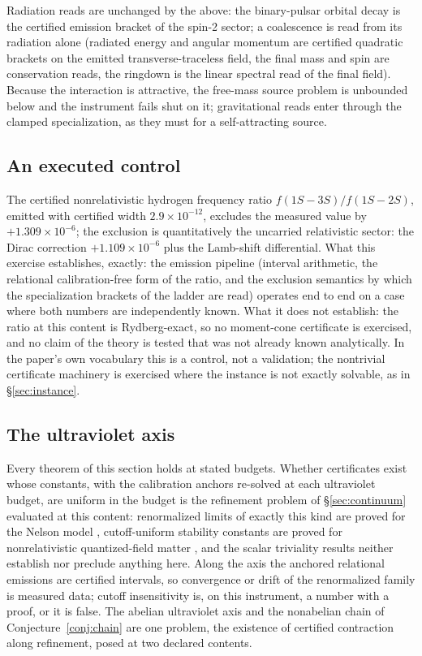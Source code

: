 \documentclass[11pt]{article}
\theoremstyle{definition}
\theoremstyle{remark}
\begin{document}
Radiation reads are unchanged by the above: the binary-pulsar orbital
decay is the certified emission bracket of the spin-2 sector; a
coalescence is read from its radiation alone (radiated energy and
angular momentum are certified quadratic brackets on the emitted
transverse-traceless field, the final mass and spin are conservation
reads, the ringdown is the linear spectral read of the final field).
Because the interaction is attractive, the free-mass source problem is
unbounded below and the instrument fails shut on it; gravitational reads
enter through the clamped specialization, as they must for a
self-attracting source.

\subsection{An executed control}\label{sec:hydrogen}
The certified nonrelativistic hydrogen frequency ratio
$f(1S{-}3S)/f(1S{-}2S)$, emitted with certified width
$2.9 \times 10^{-12}$, excludes the measured value by $+1.309 \times
10^{-6}$; the exclusion is quantitatively the uncarried relativistic
sector: the Dirac correction $+1.109 \times 10^{-6}$ plus the
Lamb-shift differential.  What this exercise establishes, exactly: the
emission pipeline (interval arithmetic, the relational
calibration-free form of the ratio, and the exclusion semantics by
which the specialization brackets of the ladder are read) operates end
to end on a case where both numbers are independently known.  What it
does not establish: the ratio at this content is Rydberg-exact, so no
moment-cone certificate is exercised, and no claim of the theory is
tested that was not already known analytically.  In the paper's own
vocabulary this is a control, not a validation; the nontrivial
certificate machinery is exercised where the instance is not exactly
solvable, as in \S\ref{sec:instance}.

\subsection{The ultraviolet axis}\label{sec:uvaxis}
Every theorem of this section holds at stated budgets.  Whether
certificates exist whose constants, with the calibration anchors
re-solved at each ultraviolet budget, are uniform in the budget is the
refinement problem of \S\ref{sec:continuum} evaluated at this content:
renormalized limits of exactly this kind are proved for the Nelson model
\cite{nelson}, cutoff-uniform stability constants are proved for
nonrelativistic quantized-field matter \cite{ffg}, and the scalar
triviality results \cite{adc} neither establish nor preclude anything
here.  Along the axis the anchored relational emissions are certified
intervals, so convergence or drift of the renormalized family is
measured data; cutoff insensitivity is, on this instrument, a number
with a proof, or it is false.  The abelian ultraviolet axis and the
nonabelian chain of Conjecture~\ref{conj:chain} are one problem, the existence of certified contraction along refinement, posed at two
declared contents.
\end{document}
